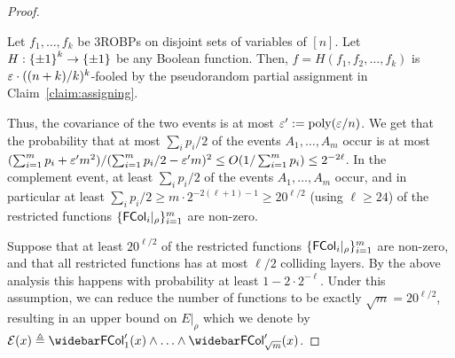\begin{proof}
\begin{lemma}\label{lemma:fooling H of width-3}
Let $f_1, \ldots, f_k$ be 3ROBPs on disjoint sets of variables of $[n]$. 
Let $H:{\{\pm1\}}^k \to {\{\pm1\}}$ be any Boolean function.
Then, $f = H(f_1, f_2, \ldots, f_k)$ is $\varepsilon\cdot ((n+k)/k)^k$-fooled by the pseudorandom partial assignment in Claim~\ref{claim:assigning}.
\end{lemma}
	Thus, the covariance of the two events is at most $\varepsilon' := {\mathrm{poly}}(\varepsilon/n)$.	
	We get that the probability that at most $\sum_{i}{p_i/2}$ of the events $A_1, \ldots, A_m$ occur is at most 
	$(\sum_{i=1}^{m} {p_i} + \varepsilon' m^2)/(\sum_{i=1}^{m}p_i/2 - \varepsilon' m)^2 \le O(1/\sum_{i=1}^{m}p_i) \le 2^{-2\ell}$.
	In the complement event, at least $\sum_{i}{p_i/2}$ of the events $A_1, \ldots, A_m$ occur, and in particular at least $\sum_{i}{p_i/2} \ge m \cdot 2^{-2(\ell+1)-1} \ge 20^{\ell/2}$ (using $\ell \ge 24$) of the restricted functions $\{{\mathsf{FCol}}_i|_\rho\}_{i=1}^m$ are non-zero. 

Suppose that at least $20^{\ell/2}$ of the restricted functions $\{{\mathsf{FCol}}_i|_\rho\}_{i=1}^m$ are non-zero, and that all restricted functions has at most $\ell/2$ colliding layers. By the above analysis this happens with probability at least $1-2\cdot 2^{-\ell}$. Under this assumption, we can reduce the number of functions to be exactly $\sqrt{m} = 20^{\ell/2}$, resulting in an upper bound on $E|_{\rho}$ which we denote by $\mE(x) \triangleq \bar{\FCol'_{1}(x)} \wedge \ldots \wedge \bar{\FCol'_{\sqrt{m}}(x)} $.
%
	\end{proof}

